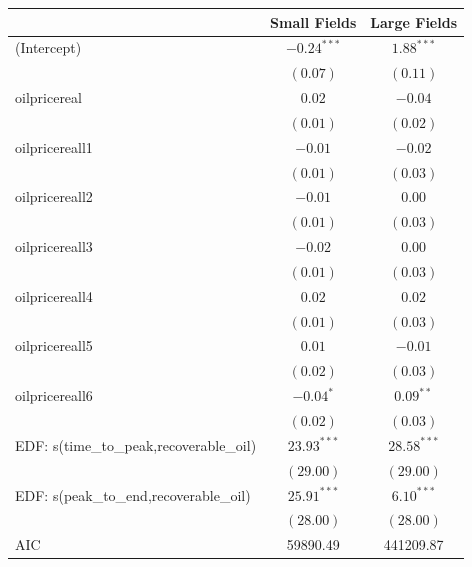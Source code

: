 \documentclass[12pt]{article}
\begin{document}
\begin{table}
\begin{center}
\begin{tabular}{l c c }
\hline
                                     & Small Fields & Large Fields \\
\hline
(Intercept)                          & $-0.24^{***}$ & $1.88^{***}$  \\
                                     & $(0.07)$      & $(0.11)$      \\
oilpricereal                       & $0.02$        & $-0.04$       \\
                                     & $(0.01)$      & $(0.02)$      \\
oilpricereall1                    & $-0.01$       & $-0.02$       \\
                                     & $(0.01)$      & $(0.03)$      \\
oilpricereall2                    & $-0.01$       & $0.00$        \\
                                     & $(0.01)$      & $(0.03)$      \\
oilpricereall3                    & $-0.02$       & $0.00$        \\
                                     & $(0.01)$      & $(0.03)$      \\
oilpricereall4                    & $0.02$        & $0.02$        \\
                                     & $(0.01)$      & $(0.03)$      \\
oilpricereall5                    & $0.01$        & $-0.01$       \\
                                     & $(0.02)$      & $(0.03)$      \\
oilpricereall6                    & $-0.04^{*}$   & $0.09^{**}$   \\
                                     & $(0.02)$      & $(0.03)$      \\
EDF: s(time_to_peak,recoverable_oil) & $23.93^{***}$ & $28.58^{***}$ \\
                                     & $(29.00)$     & $(29.00)$     \\
EDF: s(peak_to_end,recoverable_oil)  & $25.91^{***}$ & $6.10^{***}$  \\
                                     & $(28.00)$     & $(28.00)$     \\
\hline
AIC                                  & 59890.49      & 441209.87     \\

\end{tabular}
\end{center}
\end{table}
\end{document}
